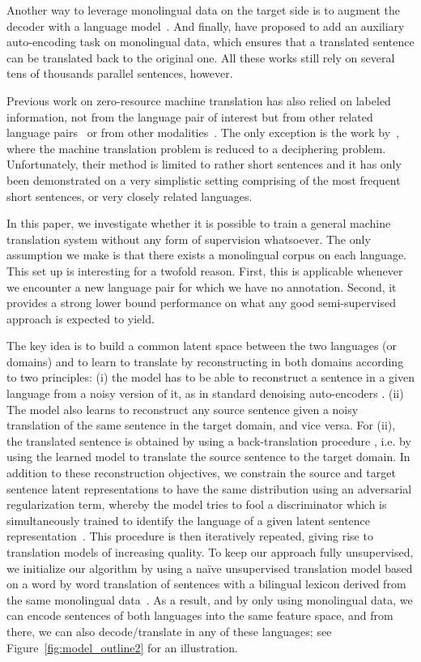 \documentclass{article} \usepackage{iclr2018_conference,times}
\begin{document}
Another way to leverage monolingual data on the target side is to augment the decoder with a language model~\citep{gulcehre2015using}. And finally, \citet{cheng16, he2016dual} have proposed to add an auxiliary auto-encoding task on monolingual data, which ensures that a translated sentence can be translated back to the original one. All these works still rely on several tens of thousands parallel sentences, however.

Previous work on zero-resource machine translation has also relied on labeled information, not from the language pair of interest but from other related language pairs~\citep{firat16, gmt17, chen17acl} or from other modalities~\citep{nakayama17, lee17}. The only exception is the work by~\citet{knight_acl11, knight17}, where the machine translation problem is reduced to a deciphering problem. Unfortunately, their method is limited to rather short sentences and it has only been demonstrated on a very simplistic setting comprising of the most frequent short sentences, or very closely related languages.

In this paper, we investigate whether it is possible to train a general machine translation system without any form of supervision whatsoever. The only assumption we make is that there exists a monolingual corpus on each language. This set up is interesting for a twofold reason. First, this is applicable whenever we encounter a new language pair for which we have no annotation. Second, it provides a strong lower bound performance on what any good semi-supervised approach is expected to yield.


The key idea is to build a common latent space between the two languages (or domains) and to learn to translate by reconstructing in both domains according to two principles: (i) the model has to be able to reconstruct a sentence in a given language from a noisy version of it, as in standard denoising auto-encoders \citep{vincent2008extracting}. (ii) The model also learns to reconstruct any source sentence given a noisy translation of the same sentence in the target domain, and vice versa. For (ii), the translated sentence is obtained by using a back-translation procedure \citep{sennrich2015improving}, i.e. by using the learned model to translate the source sentence to the target domain. In addition to these reconstruction objectives, we constrain the source and target sentence latent representations to have the same distribution using an adversarial regularization term, whereby the model tries to fool a discriminator which is simultaneously trained to identify the language of a given latent sentence representation~\citep{ganin}. This procedure is then iteratively repeated, giving rise to translation models of increasing quality. To keep our approach fully unsupervised, we initialize our algorithm by using a na\"ive unsupervised translation model based on a word by word translation of sentences with a bilingual lexicon derived from the same monolingual data~\citep{wordalign17}. As a result, and by only using monolingual data, we can encode sentences of both languages into the same feature space, and from there, we can also decode/translate in any of these languages; see Figure~\ref{fig:model_outline2} for an illustration.
\end{document}
